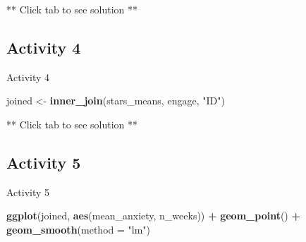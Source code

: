 \documentclass[]{book}
\newenvironment{Shaded}{\begin{snugshade}}{\end{snugshade}}
\newcommand{\DataTypeTok}[1]{\textcolor[rgb]{0.13,0.29,0.53}{#1}}
\newcommand{\FloatTok}[1]{\textcolor[rgb]{0.00,0.00,0.81}{#1}}
\newcommand{\KeywordTok}[1]{\textcolor[rgb]{0.13,0.29,0.53}{\textbf{#1}}}
\newcommand{\NormalTok}[1]{#1}
\newcommand{\OperatorTok}[1]{\textcolor[rgb]{0.81,0.36,0.00}{\textbf{#1}}}
\newcommand{\OtherTok}[1]{\textcolor[rgb]{0.56,0.35,0.01}{#1}}
\newcommand{\StringTok}[1]{\textcolor[rgb]{0.31,0.60,0.02}{#1}}
\begin{document}
\begin{Shaded}
\end{Shaded}

** Click tab to see solution **

\hypertarget{activity-4-4}{%
\subsection{Activity 4}\label{activity-4-4}}

Activity 4

\begin{Shaded}
\begin{Highlighting}[]
\NormalTok{joined <-}\StringTok{ }\KeywordTok{inner_join}\NormalTok{(stars_means, engage, }\StringTok{"ID"}\NormalTok{)}
\end{Highlighting}
\end{Shaded}

** Click tab to see solution **

\hypertarget{activity-5-6}{%
\subsection{Activity 5}\label{activity-5-6}}

Activity 5

\begin{Shaded}
\begin{Highlighting}[]
\KeywordTok{ggplot}\NormalTok{(joined, }\KeywordTok{aes}\NormalTok{(mean_anxiety, n_weeks)) }\OperatorTok{+}
\StringTok{  }\KeywordTok{geom_point}\NormalTok{() }\OperatorTok{+}
\StringTok{  }\KeywordTok{geom_smooth}\NormalTok{(}\DataTypeTok{method =} \StringTok{"lm"}\NormalTok{)}
\end{Highlighting}
\end{Shaded}
\end{document}
